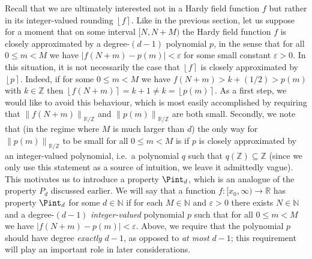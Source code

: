 \documentclass{amsart}
\theoremstyle{definition}
\newcommand{\nint}[1]{\left\lfloor #1 \right\rceil}
\newcommand{\fpa}[1]{\left\lVert #1 \right\rVert_{\RR/\ZZ}}
\newcommand{\abs}[1]{\left|#1\right|}
\newcommand{\e}{\varepsilon}
\newcommand{\NN}{\mathbb{N}}
\newcommand{\ZZ}{\mathbb{Z}}
\newcommand{\RR}{\mathbb{R}}
\renewcommand{\subset}{\subseteq}
\begin{document}
Recall that we are ultimately interested not in a Hardy field function $f$ but rather in its integer-valued rounding $\nint{f}$. Like in the previous section, let us suppose for a moment that on some interval $[N,N+M)$ the Hardy field function $f$ is closely approximated by a degree-${ (d-1)}$ polynomial $p$, in the sense that for all $0 \leq m < M$ we have $\abs{f(N+m)-p(m)} < \e$ for some small constant $\e > 0$. In this situation, it is not necessarily the case that $\nint{f}$ is closely approximated by $\nint{p}$. Indeed, if for some $0 \leq m < M$ we have $f(N+m) > k+(1/2) > p(m)$ with $k \in \ZZ$ then $\nint{f(N+m)} = k+1 \neq k = \nint{p(m)}$. As a first step, we would like to avoid this behaviour, which is most easily accomplished by requiring that $\fpa{f(N+m)}$ and $\fpa{p(m)}$ are both small. Secondly, we note that (in the regime where $M$ is much larger than $d$) the only way for $\fpa{p(m)}$ to be small for all $0 \leq m < M$ is if $p$ is closely approximated by an integer-valued polynomial, i.e.\ a polynomial $q$ such that $q(\ZZ) \subset \ZZ$ (since we only use this statement as a source of intuition, we leave it admittedly vague). This motivates us to introduce a property $\Pint_d$, which is an analogue of the property $P_d$ discussed earlier. We will say that a function $f \colon [x_0,\infty) \to \RR$ has property $\Pint_d$ for some $d \in \NN$ if for each $M \in \NN$ and $\e > 0$ there exists $N \in \NN$ and a degree-${ (d-1)}$ \emph{integer-valued} polynomial $p$ such that for all $0 \leq m < M$ we have $\abs{f(N+m)-p(m)} < \e$. Above, we require that the polynomial $p$ should have degree \emph{exactly} ${ d-1}$, as opposed to \emph{at most} ${ d-1}$; this requirement will play an important role in later considerations.
\end{document}
